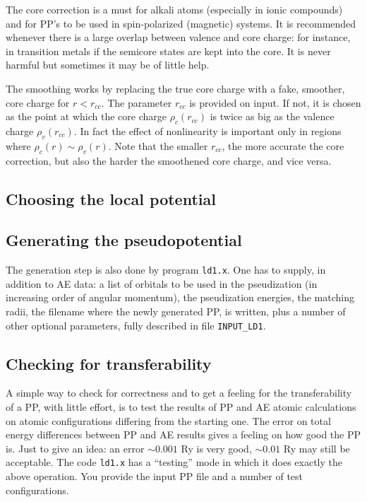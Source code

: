 The core correction is a must for alkali atoms (especially in
ionic compounds) and for PP's to be used in spin-polarized 
(magnetic) systems. It is recommended whenever there is a large 
overlap between valence and core charge: for instance, in transition 
metals if the semicore states are kept into the core. It is never 
harmful but sometimes it may be of little help.

The smoothing works by replacing the true core charge with a fake,
smoother, core charge for $r<r_{cc}$. The parameter $r_{cc}$ is
provided on input. If not, it is chosen as the point at which
the core charge $\rho_c(r_{cc})$ is twice as big as the valence
charge $\rho_v(r_{cc})$. In fact the effect of nonlinearity is 
important only in regions where $\rho_c(r)\sim\rho_v(r)$. Note 
that the smaller $r_{cc}$, the more accurate the core correction, 
but also the harder the smoothened core charge, and vice versa.

\subsection{Choosing the local potential}


\subsection{Generating the pseudopotential}

The generation step is also done by program {\tt ld1.x}.
One has to supply, in addition to AE data: a list of 
orbitals to be used in the pseudization (in increasing
order of angular momentum), the pseudization energies, 
the matching radii, the filename where the newly generated
PP, is written, plus a number of other optional parameters, 
fully described in file {\tt INPUT\_LD1}.

\subsection{Checking for transferability}

A simple way to check for correctness and to get a feeling for 
the transferability of a PP, with little effort, is to test the 
results of PP and AE atomic calculations on atomic configurations 
differing from the starting one. The error on total energy 
differences between PP and AE results gives a feeling on how 
good the PP is. Just to give an idea: an error $\sim 0.001$ Ry 
is very good, $\sim 0.01$ Ry may still be acceptable.
The code {\tt ld1.x} has a ``testing'' mode in which it does
exactly the above operation. You provide the input PP file and
a number of test configurations.

